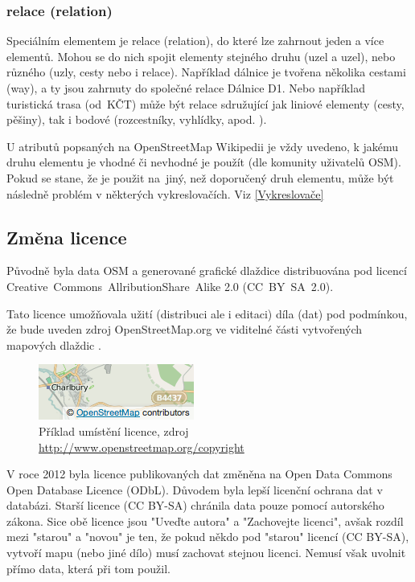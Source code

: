 \subsubsection{relace (relation) }

Speciálním elementem je relace (relation), do které lze zahrnout
jeden a více elementů. Mohou se do nich spojit elementy stejného druhu (uzel a uzel),
nebo různého (uzly, cesty nebo i relace).
Například dálnice je tvořena několika cestami (way), a ty
jsou zahrnuty do společné relace Dálnice D1. Nebo například turistická trasa
(od~KČT) může být relace sdružující jak liniové elementy (cesty, pěšiny), tak i bodové
(rozcestníky, vyhlídky, apod. ).

U atributů popsaných na OpenStreetMap Wikipedii \cite{OSMfeatures} je vždy uvedeno,
k jakému druhu elementu je
vhodné či nevhodné je použít (dle komunity uživatelů OSM). Pokud se stane, že je použit
na~jiný, než doporučený druh elementu, může být následně problém v některých vykreslovačích. 
Viz \ref{Vykreslovače}

\subsection{Změna licence}
\label{změna licence}

Původně byla data OSM a generované grafické dlaždice distribuována pod licencí
Creative~Commons~AllributionShare~Alike 2.0 (CC~BY~SA~2.0).

Tato licence umožňovala užití (distribuci ale i editaci) díla (dat) pod podmínkou,
že bude uveden zdroj OpenStreetMap.org ve viditelné části
vytvořených mapových dlaždic \cite{OSMlicence}.

  \begin{figure}[hbt]
    \centering
      \includegraphics[scale=0.75]{./pictures/attribution_example.png}
      \caption{Příklad umístění licence,
                zdroj \url{http://www.openstreetmap.org/copyright}}
      \label{fig:attribution_example}
  \end{figure} 

V roce 2012 byla licence publikovaných dat změněna na Open Data Commons
Open Database Licence (ODbL).
Důvodem byla lepší licenční ochrana dat v databázi. 
Starší licence (CC BY-SA) chránila data pouze pomocí autorského zákona. 
Sice obě licence jsou "Uveďte autora" a "Zachovejte licenci", avšak rozdíl mezi
"starou" a "novou" je ten, že pokud někdo pod "starou" licencí (CC BY-SA),
vytvoří mapu (nebo jiné dílo) musí zachovat stejnou licenci.
Nemusí však uvolnit přímo data, která při tom použil.

